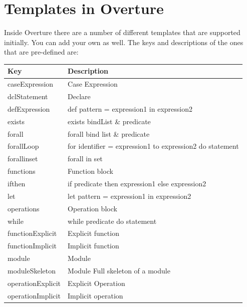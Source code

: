 \documentclass{overturerepchap}
\begin{document}
\appendix
\newpage





\newpage
\chapter{Templates in Overture}\label{app:templates}

Inside Overture there are a number of different templates that are
supported initially. You can add your own as well. The keys and
descriptions of the ones that are pre-defined are:

\begin{longtable}{| l| p{9cm}| }\hline
Key & Description\\\hline
caseExpression            & Case Expression\\
dclStatement              & Declare\\
defExpression             & def pattern = expression1 in expression2\\
exists                    & exists bindList \& predicate\\
forall                    & forall bind list \& predicate\\
forallLoop                & for identifier = expression1 to expression2 do statement\\
forallinset               & forall in set\\
functions                 & Function block\\
ifthen                    & if predicate then expression1 else expression2\\
let                       & let pattern = expression1 in expression2\\
operations                & Operation block\\
while                     & while predicate do statement\\

functionExplicit          & Explicit function\\
functionImplicit          & Implicit function\\
module                    & Module\\
moduleSkeleton            & Module Full skeleton of a module\\
operationExplicit         & Explicit Operation\\
operationImplicit         & Implicit operation\\


\end{longtable}
\end{document}
